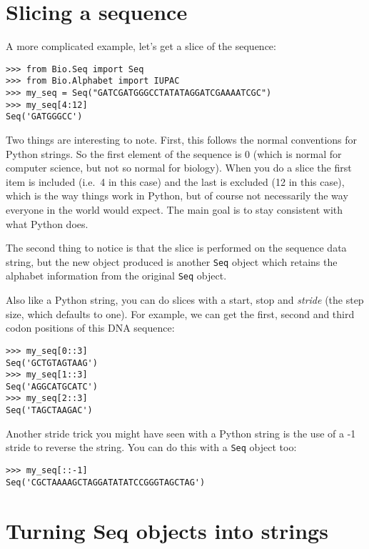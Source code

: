 \section{Slicing a sequence}

A more complicated example, let's get a slice of the sequence:

\begin{verbatim}
>>> from Bio.Seq import Seq
>>> from Bio.Alphabet import IUPAC
>>> my_seq = Seq("GATCGATGGGCCTATATAGGATCGAAAATCGC")
>>> my_seq[4:12]
Seq('GATGGGCC')
\end{verbatim}

Two things are interesting to note. First, this follows the normal conventions for Python strings.  So the first element of the sequence is 0 (which is normal for computer science, but not so normal for biology). When you do a slice the first item is included (i.e.~4 in this case) and the last is excluded (12 in this case), which is the way things work in Python, but of course not necessarily the way everyone in the world would expect. The main goal is to stay consistent with what Python does.

The second thing to notice is that the slice is performed on the sequence data string, but the new object produced is another \verb|Seq| object which retains the alphabet information from the original \verb|Seq| object.

Also like a Python string, you can do slices with a start, stop and \emph{stride} (the step size, which defaults to one).  For example, we can get the first, second and third codon positions of this DNA sequence:

\begin{verbatim}
>>> my_seq[0::3]
Seq('GCTGTAGTAAG')
>>> my_seq[1::3]
Seq('AGGCATGCATC')
>>> my_seq[2::3]
Seq('TAGCTAAGAC')
\end{verbatim}

Another stride trick you might have seen with a Python string is the use of a -1 stride to reverse the string.  You can do this with a \verb|Seq| object too:

\begin{verbatim}
>>> my_seq[::-1]
Seq('CGCTAAAAGCTAGGATATATCCGGGTAGCTAG')
\end{verbatim}

\section{Turning Seq objects into strings}
\label{sec:seq-to-string}

